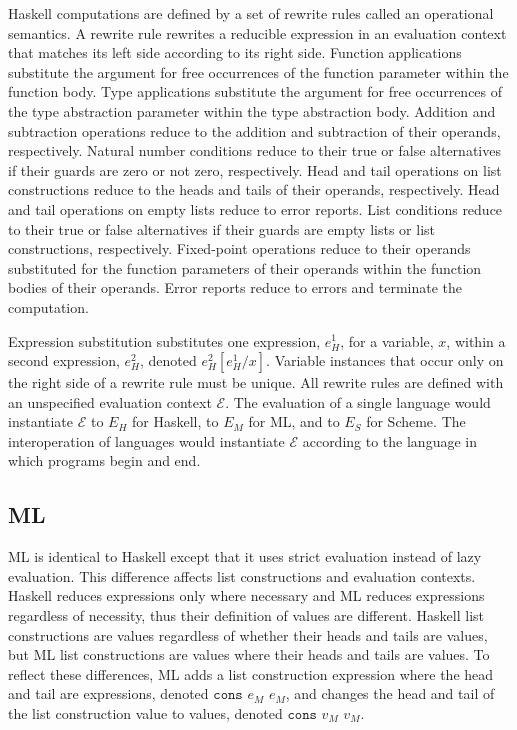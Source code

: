 Haskell computations are defined by a set of rewrite rules called an operational semantics.  A rewrite rule rewrites a reducible expression in an evaluation context that matches its left side according to its right side.  Function applications substitute the argument for free occurrences of the function parameter within the function body.  Type applications substitute the argument for free occurrences of the type abstraction parameter within the type abstraction body.  Addition and subtraction operations reduce to the addition and subtraction of their operands, respectively.  Natural number conditions reduce to their true or false alternatives if their guards are zero or not zero, respectively.  Head and tail operations on list constructions reduce to the heads and tails of their operands, respectively.  Head and tail operations on empty lists reduce to error reports.  List conditions reduce to their true or false alternatives if their guards are empty lists or list constructions, respectively.  Fixed-point operations reduce to their operands substituted for the function parameters of their operands within the function bodies of their operands.  Error reports reduce to errors and terminate the computation.

Expression substitution substitutes one expression, $e_{H}^{1}$, for a variable, $x$, within a second expression, $e_{H}^{2}$, denoted $e_{H}^{2}[e_{H}^{1}/x]$.  Variable instances that occur only on the right side of a rewrite rule must be unique.  All rewrite rules are defined with an unspecified evaluation context $\mathscr{E}$.  The evaluation of a single language would instantiate $\mathscr{E}$ to $E_{H}$ for Haskell, to $E_{M}$ for ML, and to $E_{S}$ for Scheme.  The interoperation of languages would instantiate $\mathscr{E}$ according to the language in which programs begin and end.

\subsection{ML}

ML is identical to Haskell except that it uses strict evaluation instead of lazy evaluation.  This difference affects list constructions and evaluation contexts.  Haskell reduces expressions only where necessary and ML reduces expressions regardless of necessity, thus their definition of values are different.  Haskell list constructions are values regardless of whether their heads and tails are values, but ML list constructions are values where their heads and tails are values.  To reflect these differences, ML adds a list construction expression where the head and tail are expressions, denoted $\mathtt{cons}$ $e_{M}$ $e_{M}$, and changes the head and tail of the list construction value to values, denoted $\mathtt{cons}$ $v_{M}$ $v_{M}$.

